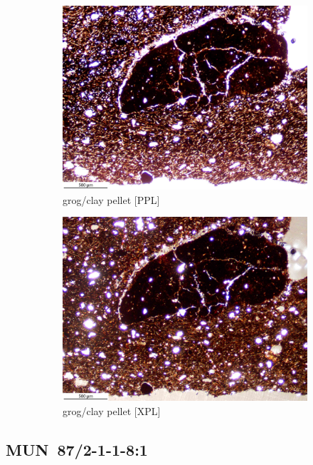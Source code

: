 \documentclass[a4paper]{article}
\begin{document}
\begin{figure}[H]
\begin{subfigure}[t]{.49\textwidth}
		\includegraphics[width=\textwidth]{ThinSections/105-2_4x_PPL.jpg}
		\caption{grog/clay pellet [PPL]}
	\end{subfigure}\hspace{.5em}\hfill
	\begin{subfigure}[t]{.49\textwidth}
		\includegraphics[width=\textwidth]{ThinSections/105-2_4x_XPL.jpg}
		\caption{grog/clay pellet [XPL]}
	\end{subfigure}
	\caption{}
	\label{fig:105_mun}
\end{figure}

\newpage\subsection{MUN~87/2-1-1-8:1 \citep[mun\#106; Fig.~\ref{fig:mun.pottery}.5; Pikunda-Munda style;][472 Pl.~91.8]{Seidensticker.2021e}}
\end{document}

